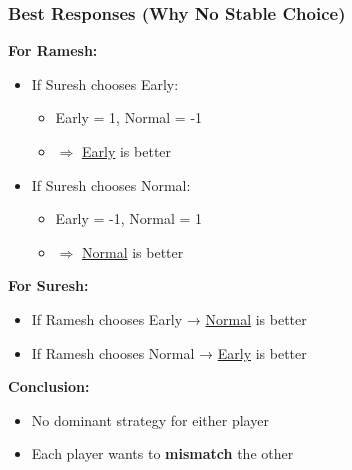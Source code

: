 \begin{frame}[fragile]\frametitle{Best Responses (Why No Stable Choice)}

\textbf{For Ramesh:}

\begin{itemize}
  \item If Suresh chooses Early:
  \begin{itemize}
    \item Early = 1, Normal = -1
    \item $\Rightarrow$ \underline{Early} is better
  \end{itemize}
  
  \item If Suresh chooses Normal:
  \begin{itemize}
    \item Early = -1, Normal = 1
    \item $\Rightarrow$ \underline{Normal} is better
  \end{itemize}
\end{itemize}

\vspace{6pt}

\textbf{For Suresh:}

\begin{itemize}
  \item If Ramesh chooses Early → \underline{Normal} is better
  \item If Ramesh chooses Normal → \underline{Early} is better
\end{itemize}

\vspace{8pt}

\textbf{Conclusion:}
\begin{itemize}
  \item No dominant strategy for either player
  \item Each player wants to \textbf{mismatch} the other
\end{itemize}

\end{frame}

